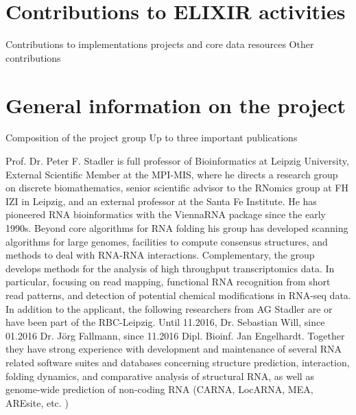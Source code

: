 \documentclass{article}
\begin{document}
\section*{Contributions to ELIXIR activities}
\label{sec:elixier}
Contributions to implementations projects and core data resources
Other contributions 

\section*{General information on the project}
\label{sec:general}
Composition of the project group 
Up to three important publications 

Prof. Dr. Peter F. Stadler is full professor of Bioinformatics at Leipzig University, External
Scientific Member at the MPI-MIS, where he directs a research group on discrete
biomathematics, senior scientific advisor to the RNomics group at FH IZI in Leipzig, and an
external professor at the Santa Fe Institute. He has pioneered RNA bioinformatics with the
ViennaRNA package since the early 1990s. Beyond core algorithms for RNA folding his
group has developed scanning algorithms for large genomes, facilities to compute
consensus structures, and methods to deal with RNA-RNA interactions. Complementary, the
group develops methods for the analysis of high throughput transcriptomics data. In
particular, focusing on read mapping, functional RNA recognition from short read patterns,
and detection of potential chemical modifications in RNA-seq data.
In addition to the applicant, the following researchers from AG Stadler are or have been 
part of the RBC-Leipzig. Until 11.2016, Dr. Sebastian Will, since 01.2016 Dr. Jörg Fallmann, since 11.2016 Dipl. Bioinf. Jan Engelhardt. Together they have strong experience with development and maintenance of several RNA related software suites and databases concerning structure prediction, interaction, folding dynamics, and comparative analysis of structural RNA, as well as genome-wide prediction of non-coding RNA (CARNA, LocARNA, MEA, AREsite, etc. )
\end{document}
